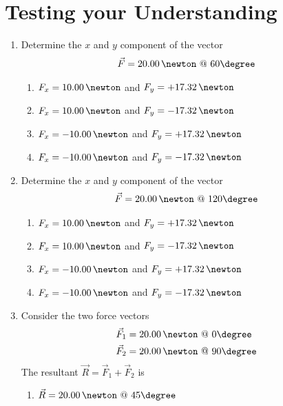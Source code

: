 
\section{Testing your Understanding}

\begin{enumerate}
\item Determine the $x$ and $y$ component of the vector
  \begin{align*} %
    \vec{F} = 20.00\,\newton \ @ \ 60\degree
  \end{align*}
  \begin{enumerate}
  \item $F_{x} =  10.00\,\newton$ and $F_{y} = +17.32\,\newton$
  \item $F_{x} =  10.00\,\newton$ and $F_{y} = -17.32\,\newton$
  \item $F_{x} = -10.00\,\newton$ and $F_{y} = +17.32\,\newton$
  \item $F_{x} = -10.00\,\newton$ and $F_{y} = -17.32\,\newton$
  \end{enumerate}
\item Determine the $x$ and $y$ component of the vector
  \begin{align*} %
    \vec{F} = 20.00\,\newton \ @ \ 120\degree
  \end{align*}
  \begin{enumerate}
  \item $F_{x} =  10.00\,\newton$ and $F_{y} = +17.32\,\newton$
  \item $F_{x} =  10.00\,\newton$ and $F_{y} = -17.32\,\newton$
  \item $F_{x} = -10.00\,\newton$ and $F_{y} = +17.32\,\newton$
  \item $F_{x} = -10.00\,\newton$ and $F_{y} = -17.32\,\newton$
  \end{enumerate}
\item Consider the two force vectors
  \begin{equation*}
    \begin{aligned} %
      \vec{F}_1 & = 20.00\,\newton \ @ \ 0\degree \\
      \vec{F}_2 & = 20.00\,\newton \ @ \ 90\degree
    \end{aligned}
  \end{equation*}
  The resultant $\vec{R} = \vec{F}_1 + \vec{F}_2$ is
  \begin{enumerate}
  \item $\vec{R} = 20.00\,\newton \ @ \ 45\degree$

\end{enumerate}
\end{enumerate}
